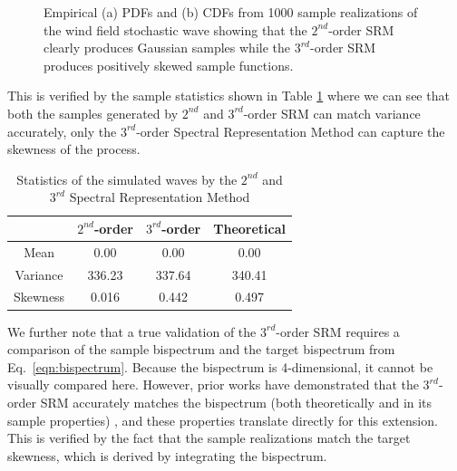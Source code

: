 \documentclass[preprint, review, 12pt]{elsarticle}
\begin{document}
\begin{figure}[!ht]
\begin{subfigure}{.46\textwidth}
  \label{fig:sample_cdf}
  \caption{}
 \end{subfigure}
 \caption{Empirical (a) PDFs and (b) CDFs from 1000 sample realizations of the wind field stochastic wave showing that the $2^{nd}$-order SRM clearly produces Gaussian samples while the $3^{rd}$-order SRM produces positively skewed sample functions.}
\label{fig:samples_distributions}
\end{figure}
This is verified by the sample statistics shown in Table \ref{tab:statistics_table} where we can see that both the samples generated by $2^{nd}$ and $3^{rd}$-order SRM can match variance accurately, only the $3^{rd}$-order Spectral Representation Method can capture the skewness of the process.
\begin{table}[!ht]
    \centering
    \begin{tabular}{|c|c|c|c|}
        \hline
        & \textbf{$2^{nd}$-order} & \textbf{$3^{rd}$-order} & \textbf{Theoretical} \\
        \hline
        Mean &  0.00 & 0.00 & 0.00 \\
        Variance & 336.23 & 337.64 & 340.41 \\
        Skewness & 0.016 & 0.442 & 0.497 \\
         \hline
    \end{tabular}
    \caption{Statistics of the simulated waves by the $2^{nd}$ and $3^{rd}$ Spectral Representation Method}
    \label{tab:statistics_table}
\end{table}
We further note that a true validation of the $3^{rd}$-order SRM requires a comparison of the sample bispectrum and the target bispectrum from Eq.\ \eqref{eqn:bispectrum}. Because the bispectrum is 4-dimensional, it cannot be visually compared here. However, prior works have demonstrated that the $3^{rd}$-order SRM accurately matches the bispectrum (both theoretically and in its sample properties) \cite{Shields2017}, and these properties translate directly for this extension. This is verified by the fact that the sample realizations match the target skewness, which is derived by integrating the bispectrum. 


\end{document}
